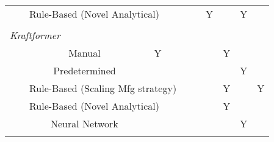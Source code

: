 \begin{tabular}{ccccccccccc}
               & \citep{Luo2010ASimulation}                                                                                      & \multicolumn{2}{l}{Rule-Based (Novel Analytical)} &            &           &           & Y             &            & Y            &           \\
               &                                                                                                         &                                  &                &            &           &           &               &            &              &           \\
\multicolumn{11}{l}{\textit{Kraftformer}} \\
               & \citep{Scherer2010DrivingProducts}                                                                              & Manual                           & Y              &            &           &           &               & Y          &              &           \\
               & \citep{Hoffman2009AnHandling}                                                                                   & Predetermined                    &                &            &           &           &               &            & Y            &           \\
               & \citep{Opritescu2012AutomatedStrategy,Opritescu2016VariationVariance,Hartmann2019Knowledge-basedPartitioning}   & \multicolumn{3}{l}{Rule-Based (Scaling Mfg strategy)}          &           &           &               & Y          &              & Y         \\
               & \citep{Yang2011GeometricalProcess}                                                                              & \multicolumn{2}{l}{Rule-Based (Novel Analytical)} &            &           &           &               & Y          &              &           \\
               & \citep{Opritescu2015AutomatedApproach,Hartmann2019AnFree-forming}                                               & Neural Network                   &                &            &           &           &               &            & Y            &           \\
               &                                                                                                         &                                  &                &            &           &           &               &            &              &           \\

\end{tabular}

